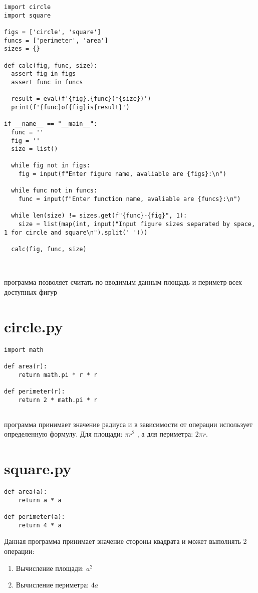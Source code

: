 \documentclass[a4paper,30pt]{article}
\begin{document}
\begin{lstlisting}
import circle
import square

figs = ['circle', 'square'] 
funcs = ['perimeter', 'area'] 
sizes = {} 

def calc(fig, func, size): 
  assert fig in figs 
  assert func in funcs

  result = eval(f'{fig}.{func}(*{size})') 
  print(f'{func}of{fig}is{result}') 

if __name__ == "__main__":
  func = ''
  fig = ''
  size = list()
    
  while fig not in figs:
    fig = input(f"Enter figure name, avaliable are {figs}:\n")
  
  while func not in funcs:
    func = input(f"Enter function name, avaliable are {funcs}:\n")
  
  while len(size) != sizes.get(f"{func}-{fig}", 1):
    size = list(map(int, input("Input figure sizes separated by space, 1 for circle and square\n").split(' ')))
  
  calc(fig, func, size)
\end{lstlisting}
\\
\begin{center}
 программа позволяет считать по вводимым данным площадь и периметр всех доступных фигур
\end{center}
\newpage
\section*{circle.py}

\begin{lstlisting}
import math

def area(r):
    return math.pi * r * r

def perimeter(r):
    return 2 * math.pi * r


\end{lstlisting}

\begin{center}
 программа принимает значение радиуса и в зависимости от операции использует определенную формулу. 
Для площади: $\pi r^2$ , а для периметра: $2\pi r$.      
\end{center}



\section*{square.py}

\begin{lstlisting}
def area(a):
    return a * a

def perimeter(a):
    return 4 * a
\end{lstlisting}
\begin{center}
\large 
Данная программа принимает значение стороны квадрата и может выполнять 2 операции:
\begin{enumerate}
    \item Вычисление площади: $a^2$
    \item Вычисление периметра: $4a$
\end{enumerate}
\end{center}
\end{document}
